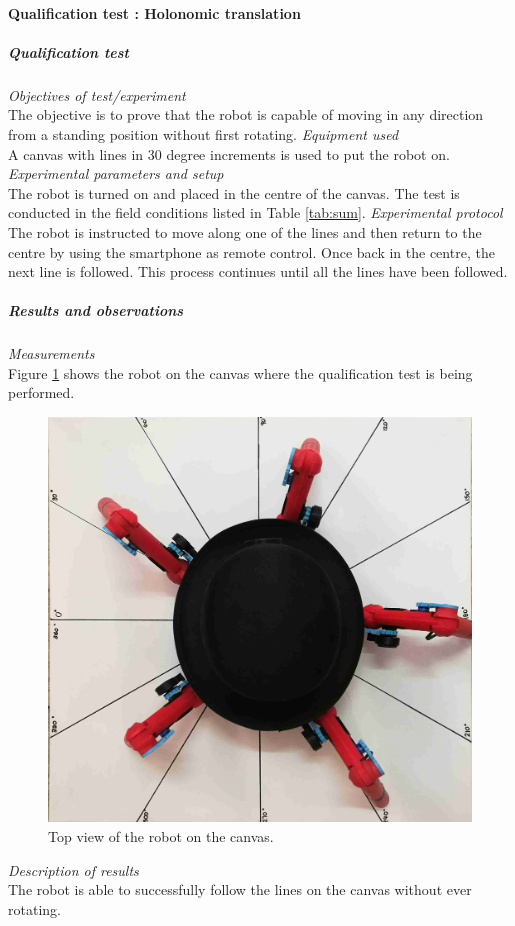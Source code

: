 \paragraph{Qualification test  : Holonomic translation}
\label{par:1}
\subparagraph{Qualification test}
\textit{Objectives of test/experiment}\\
The objective is to prove that the robot is capable of moving in any direction from a standing position without first rotating.
\textit{Equipment used}\\
A canvas with lines in 30 degree increments is used to put the robot on.
\textit{Experimental parameters and setup }\\
The robot is turned on and placed in the centre of the canvas. The test is conducted in the field conditions listed in Table \ref{tab:sum}.
\textit{Experimental protocol}\\
The robot is instructed to move along one of the lines and then return to the centre by using the smartphone as remote control. Once back in the centre, the next line is followed. This process continues until all the lines have been followed.
\subparagraph{Results and observations}
\textit{Measurements}\\
Figure \ref{fig:Res1} shows the robot on the canvas where the qualification test is being performed.
\begin{figure}[H]
\centering
\includegraphics[scale = 1]{pics/Res1.jpg}
\caption{Top view of the robot on the canvas.}
\label{fig:Res1}
\end{figure}
\textit{Description of results}\\
The robot is able to successfully follow the lines on the canvas without ever rotating.

